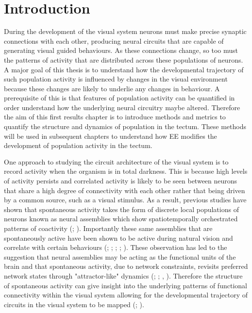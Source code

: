 \section{Introduction}
During the development of the visual system neurons must make precise synaptic connections with each other, producing neural circuits that are capable of generating visual guided behaviours. As these connections change, so too must the patterns of activity that are distributed across these populations of neurons.  A major goal of this thesis is to understand how the developmental trajectory of such population activity is influenced by changes in the visual environment because these changes are likely to underlie any changes in behaviour.  A prerequisite of this is that features of population activity can be quantified in order understand how the underlying neural circuitry maybe altered. Therefore the aim of this first results chapter is to introduce methods and metrics to quantify the structure and dynamics of population in the tectum. These methods will be used in subsequent chapters to understand how EE modifies the development of population activity in the tectum.

One approach to studying the circuit architecture of the visual system is to record activity when the organism is in total darkness. This is because high levels of activity persists and correlated activity is likely to be seen between neurons that share a high degree of connectivity with each other rather that being driven by a common source, such as a visual stimulus.  As a result, previous studies have shown that spontaneous activity takes the form of discrete local populations of neurons known as neural assemblies which show spatiotemporally orchestrated patterns of coactivity (\cite{Miller2014}; \cite{Carrillo-Reid2015}). Importantly these same assemblies that are spontaneously active have been shown to be active during natural vision and correlate with certain behaviours (\cite{Miller2014}; \cite{Carrillo-Reid2015};  \cite{Stringer2019SpontaneousActivity}; \cite{Luczak2007}; \cite{Romano2015}). These observation has led to the suggestion that neural assemblies may be acting as the functional units of the brain and that spontaneous activity, due to network constraints, revisits preferred network states through "attractor-like" dynamics (\cite{Hebb1949}; \cite{Romano2015}; \cite{Yuste2015}, \cite{Marachlian2018PrinciplesTectum}). Therefore the structure of spontaneous activity can give insight into the underlying patterns of functional connectivity within the visual system allowing for the developmental trajectory of circuits in the visual system to be mapped (\cite{Avitan2017}; \cite{Pietri2017}).

